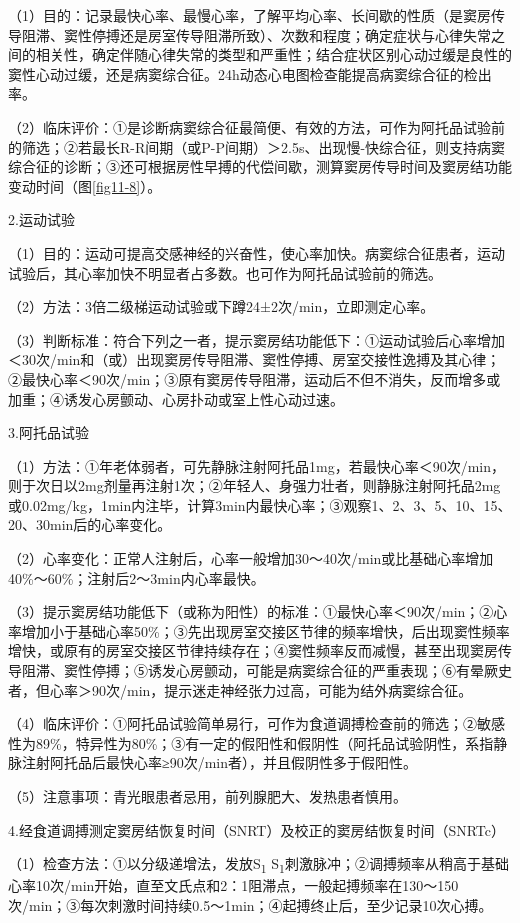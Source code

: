 （1）目的：记录最快心率、最慢心率，了解平均心率、长间歇的性质（是窦房传导阻滞、窦性停搏还是房室传导阻滞所致）、次数和程度；确定症状与心律失常之间的相关性，确定伴随心律失常的类型和严重性；结合症状区别心动过缓是良性的窦性心动过缓，还是病窦综合征。24h动态心电图检查能提高病窦综合征的检出率。

（2）临床评价：①是诊断病窦综合征最简便、有效的方法，可作为阿托品试验前的筛选；②若最长R-R间期（或P-P间期）＞2.5s、出现慢-快综合征，则支持病窦综合征的诊断；③还可根据房性早搏的代偿间歇，测算窦房传导时间及窦房结功能变动时间（图\ref{fig11-8}）。

2.运动试验

（1）目的：运动可提高交感神经的兴奋性，使心率加快。病窦综合征患者，运动试验后，其心率加快不明显者占多数。也可作为阿托品试验前的筛选。

（2）方法：3倍二级梯运动试验或下蹲24±2次/min，立即测定心率。

（3）判断标准：符合下列之一者，提示窦房结功能低下：①运动试验后心率增加＜30次/min和（或）出现窦房传导阻滞、窦性停搏、房室交接性逸搏及其心律；②最快心率＜90次/min；③原有窦房传导阻滞，运动后不但不消失，反而增多或加重；④诱发心房颤动、心房扑动或室上性心动过速。

3.阿托品试验

（1）方法：①年老体弱者，可先静脉注射阿托品1mg，若最快心率＜90次/min，则于次日以2mg剂量再注射1次；②年轻人、身强力壮者，则静脉注射阿托品2mg或0.02mg/kg，1min内注毕，计算3min内最快心率；③观察1、2、3、5、10、15、20、30min后的心率变化。

（2）心率变化：正常人注射后，心率一般增加30～40次/min或比基础心率增加40\%～60\%；注射后2～3min内心率最快。

（3）提示窦房结功能低下（或称为阳性）的标准：①最快心率＜90次/min；②心率增加小于基础心率50\%；③先出现房室交接区节律的频率增快，后出现窦性频率增快，或原有的房室交接区节律持续存在；④窦性频率反而减慢，甚至出现窦房传导阻滞、窦性停搏；⑤诱发心房颤动，可能是病窦综合征的严重表现；⑥有晕厥史者，但心率＞90次/min，提示迷走神经张力过高，可能为结外病窦综合征。

（4）临床评价：①阿托品试验简单易行，可作为食道调搏检查前的筛选；②敏感性为89\%，特异性为80\%；③有一定的假阳性和假阴性（阿托品试验阴性，系指静脉注射阿托品后最快心率≥90次/min者），并且假阴性多于假阳性。

（5）注意事项：青光眼患者忌用，前列腺肥大、发热患者慎用。

4.经食道调搏测定窦房结恢复时间（SNRT）及校正的窦房结恢复时间（SNRTc）

（1）检查方法：①以分级递增法，发放S\textsubscript{1} S\textsubscript{1}刺激脉冲；②调搏频率从稍高于基础心率10次/min开始，直至文氏点和2：1阻滞点，一般起搏频率在130～150次/min；③每次刺激时间持续0.5～1min；④起搏终止后，至少记录10次心搏。


